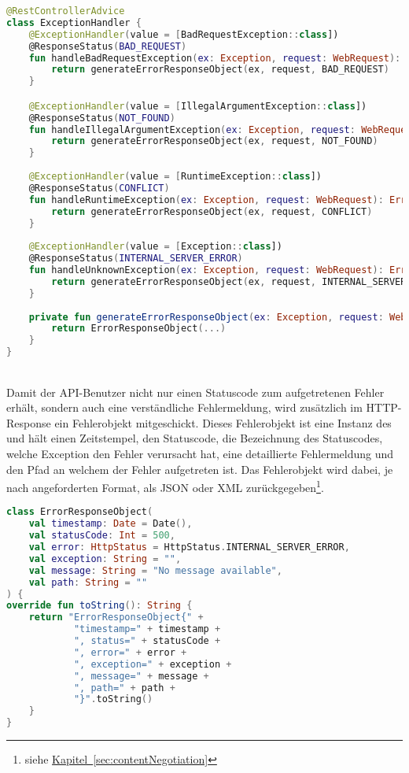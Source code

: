 \begin{lstlisting}[style=lstStyleFramed, language=Kotlin, caption={Spring-Konfiguration des Exceptionhandling}, label=lst:springExceptionHandling, float]
@RestControllerAdvice
class ExceptionHandler {
	@ExceptionHandler(value = [BadRequestException::class])
	@ResponseStatus(BAD_REQUEST)
	fun handleBadRequestException(ex: Exception, request: WebRequest): ErrorResponseObject {
		return generateErrorResponseObject(ex, request, BAD_REQUEST)
	}

	@ExceptionHandler(value = [IllegalArgumentException::class])
	@ResponseStatus(NOT_FOUND)
	fun handleIllegalArgumentException(ex: Exception, request: WebRequest): ErrorResponseObject {
		return generateErrorResponseObject(ex, request, NOT_FOUND)
	}
	
	@ExceptionHandler(value = [RuntimeException::class])
	@ResponseStatus(CONFLICT)
	fun handleRuntimeException(ex: Exception, request: WebRequest): ErrorResponseObject {
		return generateErrorResponseObject(ex, request, CONFLICT)
	}
	
	@ExceptionHandler(value = [Exception::class])
	@ResponseStatus(INTERNAL_SERVER_ERROR)
	fun handleUnknownException(ex: Exception, request: WebRequest): ErrorResponseObject {
		return generateErrorResponseObject(ex, request, INTERNAL_SERVER_ERROR)
	}
	
	private fun generateErrorResponseObject(ex: Exception, request: WebRequest, statusCode: HttpStatus): ErrorResponseObject {
		return ErrorResponseObject(...)
	}
}
\end{lstlisting}
\\
Damit der \gls{API}-Benutzer nicht nur einen Statuscode zum aufgetretenen Fehler erhält, sondern auch eine verständliche Fehlermeldung, wird zusätzlich im \gls{HTTP}-Response ein Fehlerobjekt mitgeschickt. Dieses Fehlerobjekt ist eine Instanz des  und hält einen Zeitstempel, den Statuscode, die Bezeichnung des Statuscodes, welche Exception den Fehler verursacht hat, eine detaillierte Fehlermeldung und den Pfad an welchem der Fehler aufgetreten ist. Das Fehlerobjekt wird dabei, je nach angeforderten Format, als \gls{JSON} oder \gls{XML} zurückgegeben\footnote{siehe \hyperref[sec:contentNegotiation]{Kapitel~\ref{sec:contentNegotiation}}}.
\\
\begin{lstlisting}[style=lstStyleFramed, language=Kotlin, caption={Das Fehlerobjekt \code{ErrorResponseObject}}, label=lst:errorResponseObject, float]
class ErrorResponseObject(
	val timestamp: Date = Date(),
	val statusCode: Int = 500,
	val error: HttpStatus = HttpStatus.INTERNAL_SERVER_ERROR,
	val exception: String = "",
	val message: String = "No message available",
	val path: String = ""
) {
override fun toString(): String {
	return "ErrorResponseObject{" +
			"timestamp=" + timestamp +
			", status=" + statusCode +
			", error=" + error +
			", exception=" + exception +
			", message=" + message +
			", path=" + path +
			"}".toString()
	}
}
\end{lstlisting}

